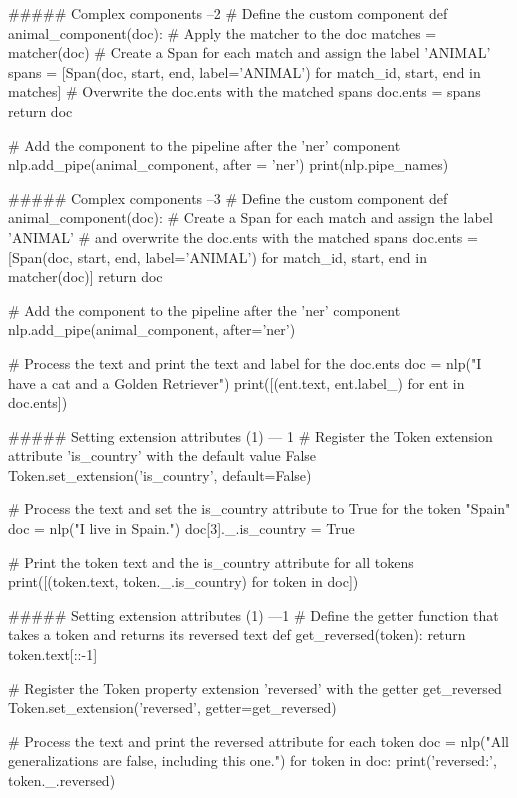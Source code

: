 ##### Complex components --2
# Define the custom component
def animal_component(doc):
    # Apply the matcher to the doc
    matches = matcher(doc)
    # Create a Span for each match and assign the label 'ANIMAL'
    spans = [Span(doc, start, end, label='ANIMAL')
             for match_id, start, end in matches]
    # Overwrite the doc.ents with the matched spans
    doc.ents = spans
    return doc

# Add the component to the pipeline after the 'ner' component 
nlp.add_pipe(animal_component, after = 'ner')
print(nlp.pipe_names)



#####  Complex components --3
# Define the custom component
def animal_component(doc):
    # Create a Span for each match and assign the label 'ANIMAL'
    # and overwrite the doc.ents with the matched spans
    doc.ents = [Span(doc, start, end, label='ANIMAL')
                for match_id, start, end in matcher(doc)]
    return doc
    
# Add the component to the pipeline after the 'ner' component 
nlp.add_pipe(animal_component, after='ner')

# Process the text and print the text and label for the doc.ents
doc = nlp("I have a cat and a Golden Retriever")
print([(ent.text, ent.label_) for ent in doc.ents])



##### Setting extension attributes (1)  --- 1
# Register the Token extension attribute 'is_country' with the default value False
Token.set_extension('is_country', default=False)

# Process the text and set the is_country attribute to True for the token "Spain"
doc = nlp("I live in Spain.")
doc[3]._.is_country = True

# Print the token text and the is_country attribute for all tokens
print([(token.text, token._.is_country) for token in doc])


##### Setting extension attributes (1) ---1
# Define the getter function that takes a token and returns its reversed text
def get_reversed(token):
    return token.text[::-1]
  
# Register the Token property extension 'reversed' with the getter get_reversed
Token.set_extension('reversed', getter=get_reversed)

# Process the text and print the reversed attribute for each token
doc = nlp("All generalizations are false, including this one.")
for token in doc:
    print('reversed:',  token._.reversed)



